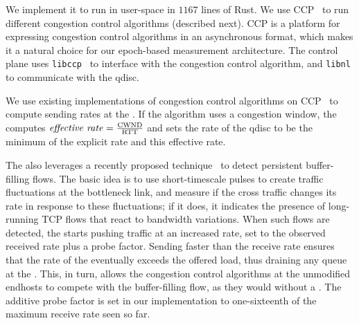 
 We implement it to run in user-space in $1167$ lines of Rust.
We use CCP~\cite{ccp} to run different congestion control algorithms (described next). CCP is a platform for expressing congestion control algorithms in an asynchronous format, which makes it a natural choice for our epoch-based measurement architecture. The control plane uses \texttt{libccp}~\cite{ccp} to interface with the congestion control algorithm, and  \texttt{libnl} to communicate with the qdisc.

 We use existing implementations of congestion control algorithms on CCP~\cite{nimbus, copa, bbr} to compute sending rates at the \inbox. If the algorithm uses a congestion window, the \inbox computes $\text{\emph{effective rate}} = \frac{\text{CWND}}{\text{RTT}}$ and sets the rate of the qdisc to be the minimum of the explicit rate and this effective rate.

The \inbox also leverages a recently proposed technique~\cite{nimbus} to detect persistent buffer-filling flows. The basic idea is to use short-timescale pulses to create traffic fluctuations at the bottleneck link, and measure if the cross traffic changes its rate in response to these fluctuations; if it does, it indicates the presence of long-running TCP flows that react to bandwidth variations. When such flows are detected, the \inbox  starts pushing traffic at an increased rate, set to the observed received rate plus a probe factor. Sending faster than the receive rate ensures that the rate of the \inbox eventually exceeds the offered load, thus draining any queue at the \inbox. This, in turn, allows the congestion control algorithms at the unmodified endhosts to compete with the buffer-filling flow, as they would without a \name. The additive probe factor is set in our implementation to one-sixteenth of the maximum receive rate seen so far. 

